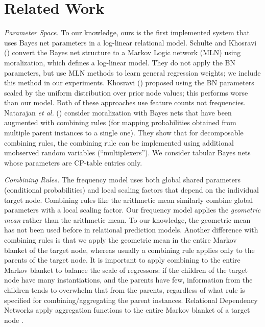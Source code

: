 \documentclass{article}
\begin{document}
\section{Related Work} \label{sec:related} 
{\em Parameter Space.} To our knowledge, ours is the first implemented system that uses Bayes net parameters in a log-linear relational model. Schulte and Khosravi (\citeyear{Schulte2012}) convert the Bayes net structure to a Markov Logic network (MLN) using moralization, which defines a log-linear model. They do not apply the BN parameters, but use MLN methods to learn general regression weights; we include this method in our experiments. Khosravi (\citeyear{Khosravi2013}) proposed using the BN parameters scaled by the uniform distribution over prior node values; this performs worse than our model. Both of these approaches use feature counts not frequencies.  Natarajan {\em et al.} (\citeyear{Natarajan2010}) consider moralization with Bayes nets that have been augmented with combining rules (for mapping probabilities obtained from multiple parent instances to a single one). They show that for decomposable combining rules, the combining rule can be implemented using additional unobserved random variables (``multiplexers''). We consider tabular Bayes nets whose parameters are CP-table entries only.

{\em Combining Rules.} The frequency model uses both global shared parameters (conditional probabilities) and local scaling factors that depend on the individual target node. 
Combining rules like the arithmetic mean \cite{Natarajan2010} similarly combine global parameters with a local scaling factor. 
Our frequency model applies the {\em geometric mean} rather than the arithmetic mean.
To our knowledge, the geometric mean has not been used before in relational prediction models. 
Another difference with combining rules is that we apply the geometric mean in the entire Markov blanket of the target node, whereas usually a combining rule applies only to the parents of the target node. It is important to apply combining to the entire Markov blanket to balance the scale of regressors: if the children of the target node have many instantiations, and the parents have few, information from the children tends to overwhelm that from the parents, regardless of what rule is specified for combining/aggregating the parent instances.
Relational Dependency Networks apply aggregation functions to the entire Markov blanket of a target node \cite{bib:jensen-chapter}. 
\end{document}
